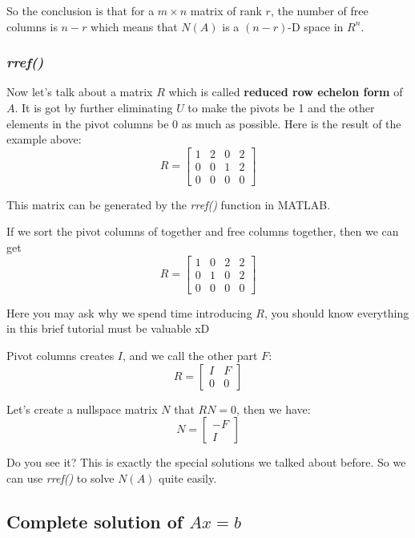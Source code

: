 \documentclass[12pt]{ctexart}
\begin{document}
So the conclusion is that for a $m \times n$ matrix of rank $r$, the number of free
columns is $n - r$ which means that $N(A)$ is a $(n - r)$-D space in $R^{n}$.

\subsubsection{\textit{rref()}}

Now let's talk about a matrix $R$ which is called \textbf{reduced row echelon form}
of $A$. It is got by further eliminating $U$ to make the pivots be 1 and the other
elements in the pivot columns be 0 as much as possible. Here is the result of the
example above:
\[
  R = \begin{bmatrix}
    1 & 2 & 0 & 2 \\
    0 & 0 & 1 & 2 \\
    0 & 0 & 0 & 0
  \end{bmatrix}
\]

This matrix can be generated by the \textit{rref()} function in MATLAB.

If we sort the pivot columns of together and free columns together, then we can get
\[
  R = \begin{bmatrix}
    1 & 0 & 2 & 2 \\
    0 & 1 & 0 & 2 \\
    0 & 0 & 0 & 0
  \end{bmatrix}
\]

Here you may ask why we spend time introducing $R$, you should know everything in this
brief tutorial must be valuable xD

Pivot columns creates $I$, and we call the other part $F$:
\[
  R = \begin{bmatrix}
    I & F \\
    0 & 0
  \end{bmatrix}
\]

Let's create a nullspace matrix $N$ that $RN = 0$, then we have:
\[
  N = \begin{bmatrix}
    -F \\ I
  \end{bmatrix}
\]

Do you see it? This is exactly the special solutions we talked about before.
So we can use \textit{rref()} to solve $N(A)$ quite easily.

\subsection{\textbf{Complete solution of $Ax = b$}}
\end{document}
